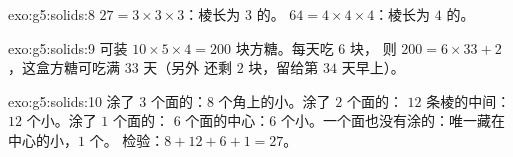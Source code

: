 \begin{solution}{exo:g5:solids:8}
$27 = 3 \times 3 \times 3$：棱长为 $3$ 的。
$64 = 4 \times 4 \times 4$：棱长为 $4$ 的。
\end{solution}

\begin{solution}{exo:g5:solids:9}
可装 $10 \times 5 \times 4 = 200$ 块方糖。每天吃 $6$ 块，
则 $200 = 6 \times 33 + 2$，这盒方糖可吃满 $33$ 天（另外
还剩 $2$ 块，留给第 $34$ 天早上）。
\end{solution}

\begin{solution}{exo:g5:solids:10}
涂了 $3$ 个面的：$8$ 个角上的小。涂了 $2$ 个面的：
$12$ 条棱的中间：$12$ 个小。涂了 $1$ 个面的：
$6$ 个面的中心：$6$ 个小。一个面也没有涂的：唯一藏在中心的小，$1$ 个。
检验：$8 + 12 + 6 + 1 = 27$。\checkmark
\end{solution}
